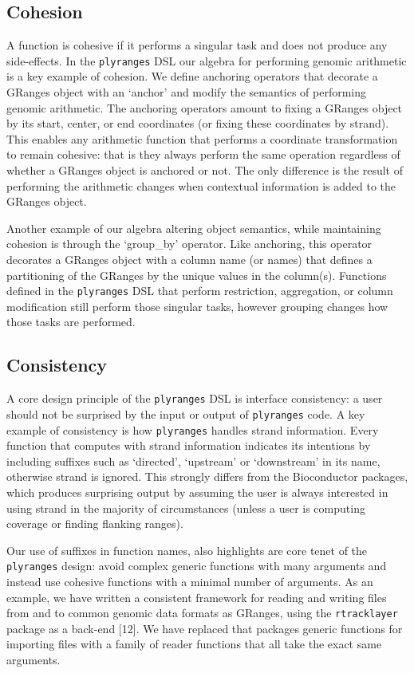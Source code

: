 \documentclass[10pt,letterpaper]{article}
\begin{document}
\subsection{Cohesion}\label{cohesion}

A function is cohesive if it performs a singular task and does not
produce any side-effects. In the \texttt{plyranges} DSL our algebra for
performing genomic arithmetic is a key example of cohesion. We define
anchoring operators that decorate a GRanges object with an `anchor' and
modify the semantics of performing genomic arithmetic. The anchoring
operators amount to fixing a GRanges object by its start, center, or end
coordinates (or fixing these coordinates by strand). This enables any
arithmetic function that performs a coordinate transformation to remain
cohesive: that is they always perform the same operation regardless of
whether a GRanges object is anchored or not. The only difference is the
result of performing the arithmetic changes when contextual information
is added to the GRanges object.

Another example of our algebra altering object semantics, while
maintaining cohesion is through the `group\_by' operator. Like
anchoring, this operator decorates a GRanges object with a column name
(or names) that defines a partitioning of the GRanges by the unique
values in the column(s). Functions defined in the \texttt{plyranges} DSL
that perform restriction, aggregation, or column modification still
perform those singular tasks, however grouping changes how those tasks
are performed.

\subsection{Consistency}\label{consistency}

A core design principle of the \texttt{plyranges} DSL is interface
consistency: a user should not be surprised by the input or output of
\texttt{plyranges} code. A key example of consistency is how
\texttt{plyranges} handles strand information. Every function that
computes with strand information indicates its intentions by including
suffixes such as `directed', `upstream' or `downstream' in its name,
otherwise strand is ignored. This strongly differs from the Bioconductor
packages, which produces surprising output by assuming the user is
always interested in using strand in the majority of circumstances
(unless a user is computing coverage or finding flanking ranges).

Our use of suffixes in function names, also highlights are core tenet of
the \texttt{plyranges} design: avoid complex generic functions with many
arguments and instead use cohesive functions with a minimal number of
arguments. As an example, we have written a consistent framework for
reading and writing files from and to common genomic data formats as
GRanges, using the \texttt{rtracklayer} package as a back-end {[}12{]}.
We have replaced that packages generic functions for importing files
with a family of reader functions that all take the exact same
arguments.
\end{document}
